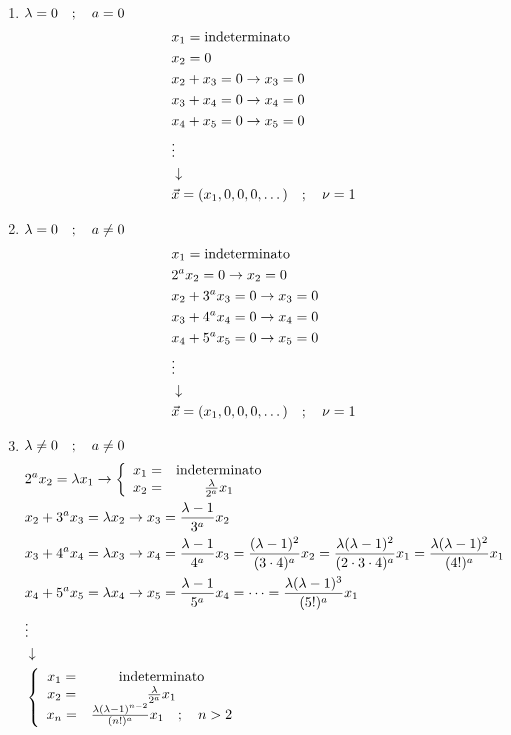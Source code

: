 \begin{enumerate}
	
	\item $\lambda = 0 \quad ; \quad a=0$
	\begin{align}
		&x_1 = \text{indeterminato}\\
		&x_2 = 0\\
		&x_2 + x_3 = 0 \to x_3 =0\\
		&x_3 + x_4 = 0 \to x_4 =0\\
		&x_4 + x_5 = 0 \to x_5=0\\
		&\vdots \nonumber \\ &\downarrow \nonumber \\
		&\vec{x} = (x_1, 0, 0, 0, \dots) \quad ; \quad \nu = 1
	\end{align}
	
	\item $\lambda = 0 \quad ; \quad a \neq 0$
	\begin{align}
		&x_1 = \text{indeterminato}\\
		&2^a x_2 = 0 \to x_2 = 0\\
		&x_2 + 3^a x_3 = 0 \to x_3 =0\\
		&x_3 + 4^a x_4 = 0 \to x_4 =0\\
		&x_4 + 5^a x_5 = 0 \to x_5=0\\
		&\vdots \nonumber \\ &\downarrow \nonumber \\
		&\vec{x} = (x_1, 0, 0, 0, \dots) \quad ; \quad \nu = 1
	\end{align}
	
	\item $\lambda \neq 0 \quad ; \quad a \neq 0$
	\begin{align}
		&2^ax_2 = \lambda x_1 \to \left\{ \begin{array}{cc} x_1 =& \text{indeterminato}\\ x_2 =& \frac{\lambda}{2^a} x_1 \end{array} \right.\\
		&x_2 + 3^a x_3 = \lambda x_2 \to x_3 = \frac{\lambda -1}{3^a} x_2 \\
		&x_3 + 4^a x_4 = \lambda x_3 \to x_4 = \frac{\lambda -1}{4^a} x_3 = \frac{(\lambda -1)^2}{(3\cdot4)^a} x_2  = \frac{\lambda(\lambda -1)^2 }{(2\cdot 3\cdot4)^a} x_1 =  \frac{\lambda(\lambda -1)^2 }{(4!)^a} x_1\\
		&x_4 + 5^a x_5 = \lambda x_4 \to x_5 = \frac{\lambda -1}{5^a} x_4 = \dots =  \frac{\lambda(\lambda -1)^3 }{(5!)^a} x_1\\
		&\vdots \nonumber \\ &\downarrow \nonumber \\
		&\left\{ \begin{array}{ccc} x_1 =& \text{indeterminato}\\ x_2 =& \frac{\lambda}{2^a} x_1\\ x_n =& \frac{\lambda(\lambda -1)^{n-2} }{(n!)^a} x_1 \quad ; \quad n>2 \end{array} \right.
	\end{align}
	

\end{enumerate}
